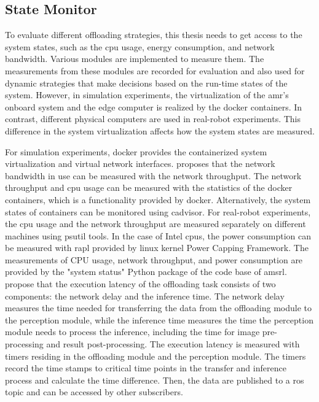 \subsection{State Monitor}

To evaluate different offloading strategies, this thesis needs to get access to the system states, such as the \gls{cpu} usage, energy consumption, and network bandwidth. Various modules are implemented to measure them. 
The measurements from these modules are recorded for evaluation and also used for dynamic strategies that make decisions based on the run-time states of the system. However, in simulation experiments, the virtualization of the \gls{amr}'s onboard system and the edge computer is realized by the \gls{docker} containers. In contrast, different physical computers are used in real-robot experiments. This difference in the system virtualization affects how the system states are measured. 

For simulation experiments, \gls{docker} provides the containerized system virtualization and virtual network interfaces. \citeauthor*{Ruggeri2022} \cite{Ruggeri2022} proposes that the network bandwidth in use can be measured with the network throughput. The network throughput and \gls{cpu} usage can be measured with the statistics of the \gls{docker} containers, which is a functionality provided by \gls{docker}. Alternatively, the system states of containers can be monitored using \gls{cadvisor}. For real-robot experiments, the \gls{cpu} usage and the network throughput are measured separately on different machines using \gls{psutil} tools. In the case of Intel \glspl{cpu}, the power consumption can be measured with \gls{rapl} provided by \gls{linux} kernel Power Capping Framework. The measurements of CPU usage, network throughput, and power consumption are provided by the "system status" Python package of the code base of \gls{amsrl}. \citeauthor*{Xie2021} \cite{Xie2021} propose that the execution latency of the offloading task consists of two components: the network delay and the inference time. The network delay measures the time needed for transferring the data from the offloading module to the perception module, while the inference time measures the time the perception module needs to process the inference, including the time for image pre-processing and result post-processing. The execution latency is measured with timers residing in the offloading module and the perception module. The timers record the time stamps to critical time points in the transfer and inference process and calculate the time difference. Then, the data are published to a \gls{ros} topic and can be accessed by other subscribers. 

